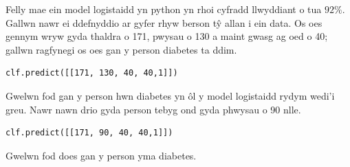 Felly mae ein model logistaidd yn python yn rhoi cyfradd llwyddiant o tua $92\%$. Gallwn nawr ei ddefnyddio ar gyfer rhyw berson t\^{y} allan i ein data. Os oes gennym wryw gyda thaldra o 171, pwysau o 130 a maint gwasg ag oed o 40; gallwn ragfynegi os oes gan y person diabetes ta ddim. 

\begin{verbatim}
clf.predict([[171, 130, 40, 40,1]])
\end{verbatim}



Gwelwn fod gan y person hwn diabetes yn \^{o}l y model logistaidd rydym wedi'i greu. Nawr nawn drio gyda person tebyg ond gyda phwysau o 90 nlle.

\begin{verbatim}
clf.predict([[171, 90, 40, 40,1]])
\end{verbatim}



Gwelwn fod does gan y person yma diabetes.